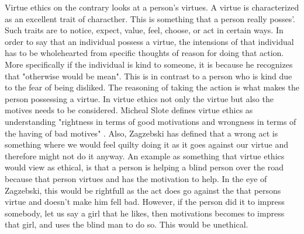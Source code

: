 Virtue ethics on the contrary looks at a person's virtues. A virtue is characterized as an excellent trait of characther. This is something that a person really posses'. Such traits are to notice, expect, value, feel, choose, or act in certain ways. In order to say that an individual possess a virtue, the intensions of that individual has to be wholehearted from specific thoughts of reason for doing that action. More specifically if the individual is kind to someone, it is because he recognizes that "otherwise would be mean". This is in contrast to a person who is kind due to the fear of being disliked. The reasoning of taking the action is what makes the person possessing a virtue. 
In virtue ethics not only the virtue but also the motives needs to be considered. Micheal Slote defines virtue ethics as understanding "rightness in terms of good motivations and wrongness in terms of the having of bad motives" \cite{slote:2001}. Also, Zagzebski has defined that a wrong act is something where we would feel quilty doing it as it goes against our virtue and therefore might not do it anyway. 
An example as something that virtue ethics would view as ethical, is that a person is helping a blind person over the road because that person virtues and has the motivation to help. In the eye of Zagzebski, this would be rightfull as the act does go against the that persons virtue and doesn't make him fell bad. However, if the person did it to impress somebody, let us say a girl that he likes, then motivations becomes to impress that girl, and uses the blind man to do so. This would be unethical. 
